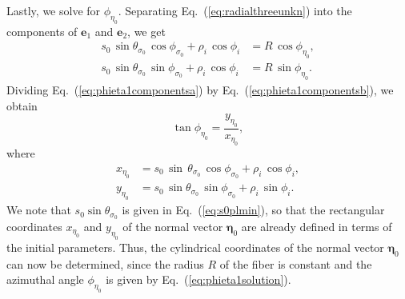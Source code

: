 \documentclass[a4paper,twocolumn,superscriptaddress]{revtex4-1}
\begin{document}
{Lastly, we solve for $\phi_{ \eta_0 }$. Separating Eq.~(\ref{eq:radialthreeunkn}) into the components of $\mathbf e_1$ and $\mathbf e_2$, we get
\begin{subequations}
\label{eq:phieta1componentsa}
  \begin{align}
\label{eq:phieta1componentsa}
    s_0\, \sin  \theta_{ \sigma_0 } \, \cos  \phi_{ \sigma_0 }  + 
    \rho_i\, \cos  \phi_i  &= 
    R \, \cos  \phi_{ \eta_0 }  ,
    \\
\label{eq:phieta1componentsb}
    s_0\,\sin  \theta_{ \sigma_0 } \, \sin  \phi_{ \sigma_0 }  + 
    \rho_i\, \cos  \phi_i  &= 
    R \, \sin  \phi_{ \eta_0 }  .
  \end{align}
\end{subequations}
Dividing Eq.~(\ref{eq:phieta1componentsa}) by Eq.~(\ref{eq:phieta1componentsb}), we obtain
	\begin{equation} \label{eq:phieta1solution}
		\tan \phi_{ \eta_0 } = \dfrac{ y_{ \eta_0 } }{ x_{ \eta_0 } } ,
	\end{equation}
where
\begin{subequations}
\label{eq:phietaxy}
\begin{align}
	x_{ \eta_0 } &= s_0\, \sin\, \theta_{ \sigma_0 } \, \cos \phi_{ \sigma_0 }  + \rho_i\, \cos  \phi_i  ,
	\\
   y_{ \eta_0 } &= s_0\, \sin \theta_{ \sigma_0 } \, \sin  \phi_{ \sigma_0 }  + \rho_i\, \sin  \phi_i  .
\end{align}
\end{subequations}
We note that $s_0 \sin \theta_{\sigma_0}$ is given in Eq.~(\ref{eq:s0plmin}), so that the rectangular coordinates 
$x_{\eta_0}$ and $y_{\eta_0}$
of the normal vector $\bm \eta_0$
are already defined in terms of the initial parameters.
Thus,
the cylindrical coordinates of the normal vector $\bm \eta_0$ can now be determined, since the radius $R$ of the fiber is constant and the azimuthal angle $\phi_{\eta_0}$ is given by Eq.~(\ref{eq:phieta1solution}).

}
\end{document}
